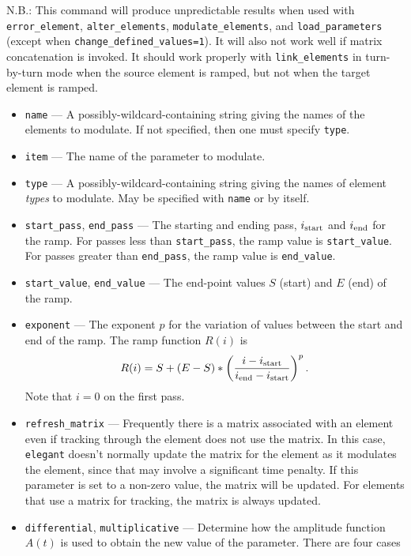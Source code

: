 \documentclass[11pt]{article}
\begin{document}
N.B.: This command will produce unpredictable results when used with
\verb|error_element|, \verb|alter_elements|, \verb|modulate_elements|, and
\verb|load_parameters| (except when \verb|change_defined_values=1|).
It will also not work well if matrix concatenation is invoked.
It should work properly with \verb|link_elements| in turn-by-turn mode
when the source element is ramped, but not when the target element
is ramped.

\begin{itemize}
\item \verb|name| --- A possibly-wildcard-containing string giving the names of the
        elements to modulate. If not specified, then one must specify \verb|type|.
\item \verb|item| --- The name of the parameter to modulate.
\item \verb|type| --- A possibly-wildcard-containing string giving the names of element
        {\em types} to modulate.  May be specified with \verb|name| or by itself.
\item \verb|start_pass|, \verb|end_pass| --- The starting and ending pass, 
  $i_{\rm start}$ and $i_{\rm end}$ for the ramp.
 For passes less than \verb|start_pass|, the ramp value is \verb|start_value|.
 For passes greater than \verb|end_pass|, the ramp value is \verb|end_value|.
\item \verb|start_value|, \verb|end_value| --- The end-point values $S$ (start) and $E$ (end) of the ramp.
\item \verb|exponent| --- The exponent $p$ for the variation of values between the start and end
  of the ramp.  The ramp function $R(i)$ is 
\begin{equation}
  R(i) = S + (E-S)*\left(\frac{i-i_{\rm start}}{i_{\rm end}-i_{\rm start}}\right)^p.
\end{equation}
Note that $i=0$ on the first pass.
\item \verb|refresh_matrix| --- Frequently there is a matrix associated with an element even
  if tracking through the element does not use the matrix.  In this case, {\tt elegant} doesn't
  normally update the matrix for the element as it modulates the element, since that may involve
  a significant time penalty.  If this parameter is set to a non-zero value, the matrix will
  be updated.  For elements that use a matrix for tracking, the matrix is always updated.
\item \verb|differential|, \verb|multiplicative| --- Determine how the amplitude function
  $A(t)$ is used to obtain the new value of the parameter.  There are four cases

\end{itemize}
\end{document}

